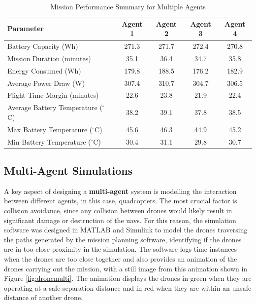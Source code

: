 \begin{table}[H]
\centering
\begin{tabular}{@{}lcccc}
\toprule
\textbf{Parameter}                & \textbf{Agent 1}  & \textbf{Agent 2}  & \textbf{Agent 3}  & \textbf{Agent 4} \\ \midrule
Battery Capacity (Wh)             & 271.3             & 271.7             & 272.4             & 270.8             \\
Mission Duration (minutes)        & 35.1              & 36.4              & 34.7              & 35.8              \\
Energy Consumed (Wh)              & 179.8             & 188.5             & 176.2             & 182.9             \\
Average Power Draw (W)            & 307.4             & 310.7             & 304.7             & 306.5             \\
Flight Time Margin (minutes)      & 22.6              & 23.8              & 21.9              & 22.4              \\
Average Battery Temperature ($^\circ$C) & 38.2              & 39.1              & 37.8              & 38.5              \\
Max Battery Temperature ($^\circ$C)    & 45.6              & 46.3              & 44.9              & 45.2              \\
Min Battery Temperature ($^\circ$C)    & 30.4              & 31.1              & 29.8              & 30.7              \\
\bottomrule
\end{tabular}
\caption{Mission Performance Summary for Multiple Agents}
\label{tab:mission_summary_extended}
\end{table}

\subsection{Multi-Agent Simulations}

A key aspect of designing a \textbf{multi-agent} system is modelling the interaction between different agents, in this case, quadcopters. The most crucial factor is collision avoidance, since any collision between drones would likely result in significant damage or destruction of the \gls{uav}s. For this reason, the simulation software was designed in MATLAB and Simulink to model the drones traversing the paths generated by the mission planning software, identifying if the drones are in too close proximity in the simulation. The software logs time instances when the drones are too close together and also provides an animation of the drones carrying out the mission, with a still image from this animation shown in Figure \ref{fig:dronemulti}. The animation displays the drones in green when they are operating at a safe separation distance and in red when they are within an unsafe distance of another drone. 

